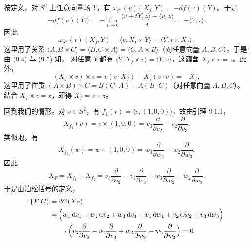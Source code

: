 \begin{wproof}
  按定义，对 $S^2$ 上任意向量场 $Y$，有
  $\omega_{S^2}(v)(X_f,Y)=-df(v)(Y)$。于是
  \begin{equation}\tag{9.4}
    -df(v)(Y)
    =-\lim_{t\to0}\frac{\langle v+tY,z\rangle-\langle v,z\rangle}{t}
    =-\langle Y,z\rangle.
  \end{equation}
  因此
  \begin{equation}\tag{9.5}
    \omega_{S^2}(v)(X_f,Y)=\langle v,X_f\times Y\rangle
    =\langle Y,v\times X_f\rangle,
  \end{equation}
  这里用了关系 $\langle A,B\times C\rangle=\langle B,C\times A\rangle
  =\langle C,A\times B\rangle$（对任意向量 $A,B,C$）。于是由 (9.4) 与 (9.5) 知，
  对任意 $Y$ 都有 $\langle Y,X_f\times v\rangle=\langle Y,z\rangle$，这蕴含
  $X_f\times v=z$。此外，
  \begin{equation*}
    (X_f\times v)\times v=v(v\cdot X_f)-X_f(v\cdot v)=-X_f,
  \end{equation*}
  这里用了性质 $(A\times B)\times C=B(C\cdot A)-A(B\cdot C)$（对任意向量 $A,B,C$）。
  结合 $X_f\times v=z$，即得 $X_f=v\times z$。
\end{wproof}

回到我们的情形。对 $v\in S^2$，有 $f_1(v)=\langle v,(1,0,0)\rangle$，故由引理 9.1.1，
\begin{equation*}
  X_{f_1}(v)=v\times(1,0,0)
  =v_3\frac{\partial}{\partial v_2}-v_2\frac{\partial}{\partial v_3}.
\end{equation*}
类似地，有
\begin{equation*}
  X_{f_2}(w)=w\times(1,0,0)
  =w_3\frac{\partial}{\partial w_2}-w_2\frac{\partial}{\partial w_3}.
\end{equation*}
因此
\begin{equation*}
  X_F=X_{f_1}+X_{f_2}
  =v_3\frac{\partial}{\partial v_2}-v_2\frac{\partial}{\partial v_3}
  +w_3\frac{\partial}{\partial w_2}-w_2\frac{\partial}{\partial w_3}.
\end{equation*}
于是由泊松括号的定义，
\begin{equation*}
\begin{aligned}
  \{F,G\}&=dG(X_F)\\
  &=\Bigl(w_1\,\mathrm{d} v_1+w_2\,\mathrm{d} v_2+w_3\,\mathrm{d} v_3
    +v_1\,\mathrm{d} w_1+v_2\,\mathrm{d} w_2+v_3\,\mathrm{d} w_3\Bigr)\\
  &\qquad\cdot\Bigl(v_3\frac{\partial}{\partial v_2}-v_2\frac{\partial}{\partial v_3}
    +w_3\frac{\partial}{\partial w_2}-w_2\frac{\partial}{\partial w_3}\Bigr)=0.
\end{aligned}
\end{equation*}

